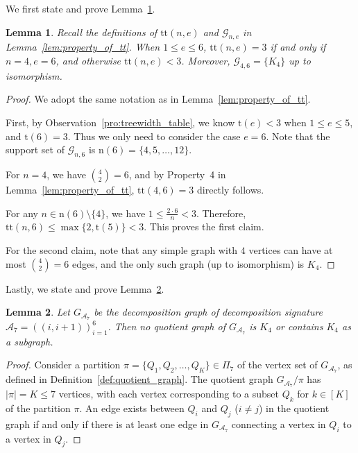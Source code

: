 \documentclass[sn-mathphys, natbib=false]{sn-jnl}
\theoremstyle{plain}
\newtheorem{lemma}{Lemma}
\theoremstyle{definition}
\newcommand{\partition}{\Pi}
\newcommand{\partitionp}[1]{\partition_{#1}}
\newcommand{\graphset}{\mathcal{G}}
\newcommand{\graphsetne}[2]{\graphset_{#1,#2}}
\newcommand{\completegraphp}[1]{K_{#1}}
\newcommand{\graphform}[1]{G_{#1}}
\def\calA{\mathcal{A}}
\begin{document}
\begin{bibunit}[agsm]
We first state and prove Lemma~\ref{lem:HOIF_table_lem_1}.
\begin{lemma}
\label{lem:HOIF_table_lem_1}
Recall the definitions of $\mathrm{tt}(n, e)$ and $\graphsetne{n}{e}$ in Lemma~\ref{lem:property_of_tt}. When $1\le e \le  6$, $\mathrm{tt}(n, e) = 3$ if and only if $n = 4, e = 6$, and otherwise $\mathrm{tt}(n, e) < 3$. Moreover, $\graphsetne{4}{6} = \{\completegraphp{4}\}$ up to isomorphism.
\end{lemma}

\begin{proof}
We adopt the same notation as in Lemma~\ref{lem:property_of_tt}.

First, by Observation~\ref{pro:treewidth_table}, we know $\mathrm{t} (e) < 3$ when $1 \le e \le 5$, and $\mathrm{t}(6) = 3$. Thus we only need to consider the case $e = 6$. Note that the support set of $\graphsetne{n}{6}$ is $\mathrm{n}(6) = \{4,5,\dots,12\}$.
    
For $n = 4$, we have $\binom{4}{2} = 6$, and by Property~4 in Lemma~\ref{lem:property_of_tt}, $\mathrm{tt}(4, 6) = 3$ directly follows.  
    
For any $n \in \mathrm{n}(6) \setminus \{4\}$, we have $1 \le \frac{2 \cdot 6}{n} < 3$.  Therefore, $\mathrm{tt}(n, 6) \le \max\{ 2, \mathrm{t}(5) \} < 3$. This proves the first claim.
    
For the second claim, note that any simple graph with $4$ vertices can have at most $\binom{4}{2} = 6$ edges, and the only such graph (up to isomorphism) is $\completegraphp{4}$. 
\end{proof}

Lastly, we state and prove Lemma~\ref{lem:HOIF_table_lem_2}.

\begin{lemma}
\label{lem:HOIF_table_lem_2}
Let $\graphform{\calA_7}$ be the decomposition graph of decomposition signature $\calA_7 = ((i,i+1))_{i=1}^6$. Then no quotient graph of $\graphform{\calA_7}$ is $\completegraphp{4}$ or contains $\completegraphp{4}$ as a subgraph.
\end{lemma}

\begin{proof}
Consider a partition $\pi = \{Q_1, Q_2, \dots, Q_K\} \in \partitionp{7}$ of the vertex set of $\graphform{\calA_7}$, as defined in Definition~\ref{def:quotient_graph}. 
The quotient graph $\graphform{\calA_7} / \pi$ has $|\pi| = K \le 7$ vertices, with each vertex corresponding to a subset $Q_k$ for $k \in [K]$ of the partition $\pi$. An edge exists between $Q_i$ and $Q_j$ ($i \neq j$) in the quotient graph if and only if there is at least one edge in $\graphform{\calA_7}$ connecting a vertex in $Q_i$ to a vertex in $Q_j$.


\end{proof}
\end{bibunit}
\end{document}
